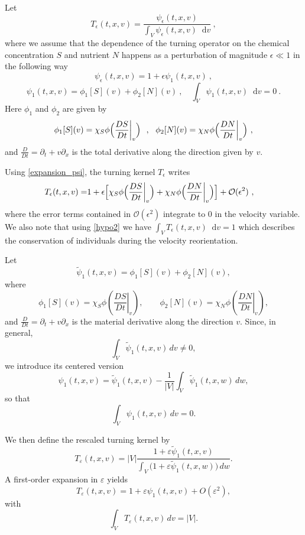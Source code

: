 \documentclass[11pt,twoside]{article}
\numberwithin{equation}{section}
\newcommand*\diff{\mathop{}\!\mathrm{d}}
\theoremstyle{plain}
\theoremstyle{nonumberplain}
\begin{document}
Let 
\begin{equation}\label{TepsFeps}
    T_\epsilon(t,x,v)=\frac{\psi_\epsilon(t,x,{v}) }{\displaystyle\int_{V}\psi_\epsilon(t,x,{v})  \diff {v}}\ ,
\end{equation}
where we assume that the dependence of the turning operator on the chemical concentration $S$ and nutrient $N$ happens as a perturbation of magnitude $\epsilon\ll 1$ in the following way
\begin{equation}\label{expansion_psi}
    \psi_\epsilon(t,x,{v})=1+\epsilon\psi_1(t,x,{v})\ ,
\end{equation}
\begin{equation}
\psi_1(t,x,{v}) = \phi_1[S]({v}) + \phi_2[N]({v})\ , \quad\int_V\psi_1(t,x,{v})\diff {v}=0 \ . \label{hypo2}
\end{equation}
Here $\phi_1$ and $\phi_2$ are given by
$$\phi_1[S]({v})=\chi_S\phi\Bigl(\frac{DS}{Dt}\bigg\rvert_{v}\Bigr)\ \ ,\ \ \phi_2[N](v)= \chi_N\phi\Bigl(\frac{DN}{Dt}\bigg\rvert_{v}\Bigr)\ ,$$
and $\frac{D}{Dt}=\partial_t+{v}\partial_x$ is the total derivative along the direction given by ${v}$.

Using \eqref{expansion_psi}, the turning kernel $T_\epsilon$ writes
\begin{align}
    T_\epsilon(t,x,{v})=& 1+\epsilon\Bigl[\chi_S\phi\Bigl(\frac{DS}{Dt}\bigg\rvert_{v}\Bigr)+ \chi_N\phi\Bigl(\frac{DN}{Dt}\bigg\rvert_{v}\Bigr)\Bigr]  + {\mathcal{O}(\epsilon^2)} \ ,\label{eq: turning operator scaled}
\end{align}
{where the error terms contained in $\mathcal{O}(\epsilon^2)$ integrate to $0$ in the velocity variable. We also note that using \eqref{hypo2} we have $\int_V T_\epsilon(t,x,v)\diff v=1$ which describes the conservation of individuals during the velocity reorientation.}

{\color{red} 
Let
\[
\widetilde{\psi}_1(t,x,v)=\phi_1[S](v)+\phi_2[N](v),
\]
where
\[
\phi_1[S](v)=\chi_S\phi\!\left(\left.\frac{DS}{Dt}\right|_v\right),
\qquad
\phi_2[N](v)=\chi_N\phi\!\left(\left.\frac{DN}{Dt}\right|_v\right),
\]
and
$
\frac{D}{Dt}=\partial_t+v\partial_x
$
is the material derivative along the direction \(v\).
Since, in general,
\[
\int_V \widetilde{\psi}_1(t,x,v)\,dv \neq 0,
\]
we introduce its centered version
\[
\psi_1(t,x,v)
=
\widetilde{\psi}_1(t,x,v)
-
\frac1{|V|}\int_V \widetilde{\psi}_1(t,x,w)\,dw,
\]
so that
\[
\int_V \psi_1(t,x,v)\,dv = 0.
\]

We then define the rescaled turning kernel by
\[
T_\varepsilon(t,x,v)
=
|V|
\frac{1+\varepsilon \widetilde{\psi}_1(t,x,v)}
{\displaystyle \int_V \bigl(1+\varepsilon \widetilde{\psi}_1(t,x,w)\bigr)\,dw }.
\]
A first-order expansion in \(\varepsilon\) yields
\[
T_\varepsilon(t,x,v)=1+\varepsilon \psi_1(t,x,v)+O(\varepsilon^2),
\]
with
\[
\int_V T_\varepsilon(t,x,v)\,dv = |V|.
\]
}
\end{document}
